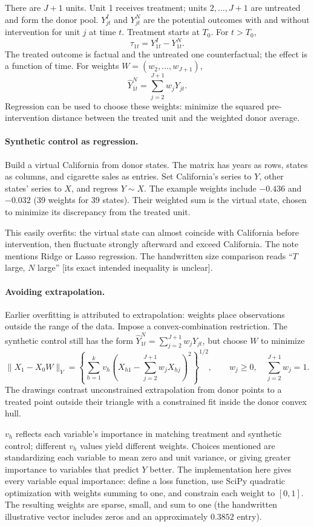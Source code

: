 There are $J+1$ units. Unit 1 receives treatment; units $2,\ldots,J+1$ are untreated and form the donor pool. $Y_{jt}^{I}$ and $Y_{jt}^{N}$ are the potential outcomes with and without intervention for unit $j$ at time $t$. Treatment starts at $T_0$. For $t>T_0$,
\[\tau_{1t}=Y_{1t}^{I}-Y_{1t}^{N}.\]
The treated outcome is factual and the untreated one counterfactual; the effect is a function of time. For weights $W=(w_2,\ldots,w_{J+1})$,
\[\widehat Y_{1t}^{N}=\sum_{j=2}^{J+1}w_jY_{jt}.\]
Regression can be used to choose these weights: minimize the squared pre-intervention distance between the treated unit and the weighted donor average.

\paragraph{Synthetic control as regression.}
Build a virtual California from donor states. The matrix has years as rows, states as columns, and cigarette sales as entries. Set California's series to $Y$, other states' series to $X$, and regress $Y\sim X$. The example weights include $-0.436$ and $-0.032$ (39 weights for 39 states). Their weighted sum is the virtual state, chosen to minimize its discrepancy from the treated unit.

This easily overfits: the virtual state can almost coincide with California before intervention, then fluctuate strongly afterward and exceed California. The note mentions Ridge or Lasso regression. The handwritten size comparison reads ``$T$ large, $N$ large'' [its exact intended inequality is unclear].

\paragraph{Avoiding extrapolation.}
Earlier overfitting is attributed to extrapolation: weights place observations outside the range of the data. Impose a convex-combination restriction. The synthetic control still has the form $\widehat Y_{1t}^{N}=\sum_{j=2}^{J+1}w_jY_{jt}$, but choose $W$ to minimize
\[\|X_1-X_0W\|_V=
\left\{\sum_{h=1}^{k}v_h\left(X_{h1}-\sum_{j=2}^{J+1}w_jX_{hj}\right)^2\right\}^{1/2},
\qquad w_j\ge0,\quad\sum_{j=2}^{J+1}w_j=1.
\]
The drawings contrast unconstrained extrapolation from donor points to a treated point outside their triangle with a constrained fit inside the donor convex hull.

$v_h$ reflects each variable's importance in matching treatment and synthetic control; different $v_h$ values yield different weights. Choices mentioned are standardizing each variable to mean zero and unit variance, or giving greater importance to variables that predict $Y$ better. The implementation here gives every variable equal importance: define a loss function, use SciPy quadratic optimization with weights summing to one, and constrain each weight to $[0,1]$. The resulting weights are sparse, small, and sum to one (the handwritten illustrative vector includes zeros and an approximately $0.3852$ entry).

